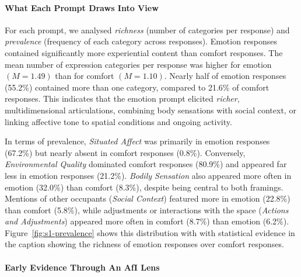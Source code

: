 \paragraph{What Each Prompt Draws Into View}
For each prompt, we analysed \textit{richness} (number of categories per response) and \textit{prevalence} (frequency of each category across responses). Emotion responses contained significantly more experiential content than comfort responses. The mean number of expression categories per response was higher for emotion $(M = 1.49)$ than for comfort $(M = 1.10)$. Nearly half of emotion responses (55.2\%) contained more than one category, compared to 21.6\% of comfort responses. This indicates that the emotion prompt elicited \emph{richer}, multidimensional articulations, combining body sensations with social context, or linking affective tone to spatial conditions and ongoing activity.

In terms of prevalence, \textit{Situated Affect} was primarily in emotion responses (67.2\%) but nearly absent in comfort responses (0.8\%). Conversely, \textit{Environmental Quality} dominated comfort responses (80.9\%) and appeared far less in emotion responses (21.2\%). \textit{Bodily Sensation} also appeared more often in emotion (32.0\%) than comfort (8.3\%), despite being central to both framings. Mentions of other occupants (\textit{Social Context}) featured more in emotion (22.8\%) than comfort (5.8\%), while adjustments or interactions with the space (\textit{Actions and Adjustments}) appeared more often in comfort (8.7\%) than emotion (6.2\%). Figure~\ref{fig:s1-prevalence} shows this distribution with with statistical evidence in the caption showing the richness of emotion responses over comfort responses.


\paragraph{Early Evidence Through An AfI Lens}

